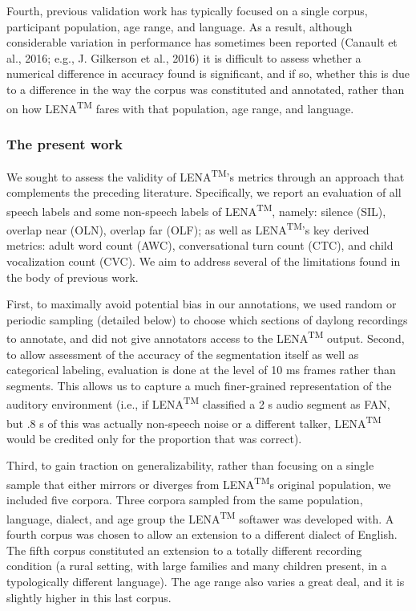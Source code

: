 \documentclass[english,floatsintext,man]{apa6}
\begin{document}
Fourth, previous validation work has typically focused on a single
corpus, participant population, age range, and language. As a result,
although considerable variation in performance has sometimes been
reported (Canault et al., 2016; e.g., J. Gilkerson et al., 2016) it is
difficult to assess whether a numerical difference in accuracy found is
significant, and if so, whether this is due to a difference in the way
the corpus was constituted and annotated, rather than on how
LENA\textsuperscript{TM} fares with that population, age range, and
language.

\subsubsection{The present work}\label{the-present-work}

We sought to assess the validity of LENA\textsuperscript{TM}'s metrics
through an approach that complements the preceding literature.
Specifically, we report an evaluation of all speech labels and some
non-speech labels of LENA\textsuperscript{TM}, namely: silence (SIL),
overlap near (OLN), overlap far (OLF); as well as
LENA\textsuperscript{TM}'s key derived metrics: adult word count (AWC),
conversational turn count (CTC), and child vocalization count (CVC). We
aim to address several of the limitations found in the body of previous
work.

First, to maximally avoid potential bias in our annotations, we used
random or periodic sampling (detailed below) to choose which sections of
daylong recordings to annotate, and did not give annotators access to
the LENA\textsuperscript{TM} output. Second, to allow assessment of the
accuracy of the segmentation itself as well as categorical labeling,
evaluation is done at the level of 10 ms frames rather than segments.
This allows us to capture a much finer-grained representation of the
auditory environment (i.e., if LENA\textsuperscript{TM} classified a 2 s
audio segment as FAN, but .8 s of this was actually non-speech noise or
a different talker, LENA\textsuperscript{TM} would be credited only for
the proportion that was correct).

Third, to gain traction on generalizability, rather than focusing on a
single sample that either mirrors or diverges from
LENA\textsuperscript{TM}s original population, we included five corpora.
Three corpora sampled from the same population, language, dialect, and
age group the LENA\textsuperscript{TM} softawer was developed with. A
fourth corpus was chosen to allow an extension to a different dialect of
English. The fifth corpus constituted an extension to a totally
different recording condition (a rural setting, with large families and
many children present, in a typologically different language). The age
range also varies a great deal, and it is slightly higher in this last
corpus.
\end{document}
